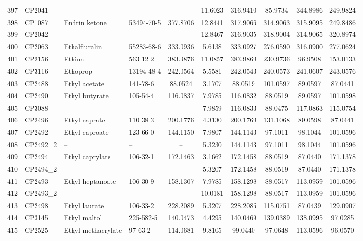 \begin{longtable}{clllcccccc}
397 & CP2041 & – & – & – & 11.6023 & 316.9410 & 85.9734 & 344.8986 & 249.9824 \\ 
398 & CP1087 & Endrin ketone & 53494-70-5 & 377.8706 & 12.8441 & 317.9066 & 314.9063 & 315.9095 & 249.8486 \\ 
399 & CP2042 & – & – & – & 12.8467 & 316.9035 & 318.9004 & 314.9065 & 320.8974 \\ 
400 & CP2063 & Ethalfluralin & 55283-68-6 & 333.0936 & 5.6138 & 333.0927 & 276.0590 & 316.0900 & 277.0624 \\ 
401 & CP2156 & Ethion & 563-12-2 & 383.9876 & 11.0857 & 383.9869 & 230.9736 & 96.9508 & 153.0133 \\ 
402 & CP3116 & Ethoprop & 13194-48-4 & 242.0564 & 5.5581 & 242.0543 & 240.0573 & 241.0607 & 243.0576 \\ 
403 & CP2488 & Ethyl acetate & 141-78-6 & 88.0524 & 3.1707 & 88.0519 & 101.0597 & 89.0597 & 87.0441 \\ 
404 & CP2490 & Ethyl butyrate\smash{\textsuperscript{\textdaggerdbl}} & 105-54-4 & 116.0837 & 7.9785 & 116.0832 & 88.0519 & 89.0597 & 101.0598 \\ 
405 & CP3088 & – & – & – & 7.9859 & 116.0833 & 88.0475 & 117.0863 & 115.0754 \\ 
406 & CP2496 & Ethyl caprate\smash{\textsuperscript{\textdagger}} & 110-38-3 & 200.1776 & 4.3130 & 200.1769 & 131.1068 & 89.0598 & 87.0441 \\ 
407 & CP2492 & Ethyl caproate & 123-66-0 & 144.1150 & 7.9807 & 144.1143 & 97.1011 & 98.1044 & 101.0596 \\ 
408 & CP2492\_2 & – & – & – & 5.3230 & 144.1143 & 97.1011 & 98.1044 & 101.0596 \\ 
409 & CP2494 & Ethyl caprylate & 106-32-1 & 172.1463 & 3.1662 & 172.1458 & 88.0519 & 87.0440 & 171.1378 \\ 
410 & CP2494\_2 & – & – & – & 5.3207 & 172.1458 & 88.0519 & 87.0440 & 171.1378 \\ 
411 & CP2493 & Ethyl heptanoate & 106-30-9 & 158.1307 & 7.9785 & 158.1298 & 88.0517 & 113.0959 & 101.0596 \\ 
412 & CP2493\_2 & – & – & – & 10.0181 & 158.1298 & 88.0517 & 113.0959 & 101.0596 \\ 
413 & CP2498 & Ethyl laurate & 106-33-2 & 228.2089 & 5.3207 & 228.2085 & 115.0751 & 87.0439 & 129.0907 \\ 
414 & CP3145 & Ethyl maltol & 225-582-5 & 140.0473 & 4.4295 & 140.0469 & 139.0389 & 138.0995 & 97.0285 \\ 
415 & CP2525 & Ethyl methacrylate & 97-63-2 & 114.0681 & 9.8105 & 99.0440 & 97.0648 & 113.0596 & 96.0570 \\ 

\end{longtable}
